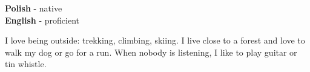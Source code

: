 \documentclass[9pt]{developercv}
\begin{document}

\begin{minipage}[t]{0.2\textwidth}
	\vspace{-\baselineskip} %

	
	\textbf{Polish} - native \\ \textbf{English} - proficient
\end{minipage}
\hfill
\begin{minipage}[t]{0.7\textwidth}
	\vspace{-\baselineskip} %
	
	
	I love being outside: trekking, climbing, skiing. I live close to a forest and love to walk my dog or go for a run. When nobody is listening, I like to play guitar or tin whistle.
\end{minipage}
\end{document}
